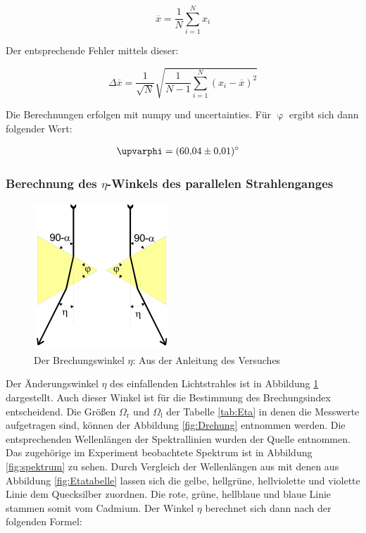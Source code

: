 \begin{equation}
  \label{eqn:mittelwert}
  \overline{x} = \frac{1}{N} \sum_{i=1}^N x_i
\end{equation}

Der entsprechende Fehler mittels dieser:

\begin{equation}
  \label{eqn:mittelwertfehler}
  \Delta \overline{x} = \frac{1}{\sqrt{N}} \sqrt{\frac{1}{N-1} \sum_{i=1}^N (x_i - \overline{x})^2}
\end{equation}

Die Berechnungen erfolgen mit numpy und uncertainties.
Für $\upvarphi$ ergibt sich dann folgender Wert:

\begin{align*}
  \upvarphi &= \SI{60.04 \pm 0.01}{\degree}
\end{align*}

\subsubsection{Berechnung des \texorpdfstring{$\eta$}{eta}-Winkels des parallelen Strahlenganges}

\begin{figure}
  \centering
  \includegraphics[scale=0.6]{images/Eta2.png}
  \caption{Der Brechungswinkel $\eta$: Aus der Anleitung des Versuches \cite[25]{1}}
  \label{fig:Eta2}
\end{figure}

Der Änderungswinkel $\eta$ des einfallenden Lichtstrahles ist in Abbildung \ref{fig:Eta2} dargestellt.
Auch dieser Winkel ist für die Bestimmung des Brechungsindex entscheidend.
Die Größen $\Omega_{\text{r}}$ und $\Omega_{\text{l}}$ der Tabelle \ref{tab:Eta} in denen die Messwerte aufgetragen sind, können der Abbildung \ref{fig:Drehung} entnommen werden.
Die entsprechenden Wellenlängen der Spektrallinien wurden der Quelle \cite{2} entnommen.
Das zugehörige im Experiment beobachtete Spektrum ist in Abbildung \ref{fig:spektrum} zu sehen.
Durch Vergleich der Wellenlängen aus \cite{2} mit denen aus Abbildung \ref{fig:Etatabelle} lassen sich
die gelbe, hellgrüne, hellviolette und violette Linie dem Quecksilber zuordnen.
Die rote, grüne, hellblaue  und blaue Linie stammen somit vom Cadmium.
Der Winkel $\eta$ berechnet sich dann nach der folgenden Formel:


